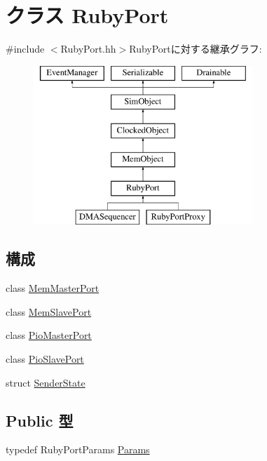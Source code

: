 \hypertarget{classRubyPort}{
\section{クラス RubyPort}
\label{classRubyPort}
}


{\ttfamily \#include $<$RubyPort.hh$>$}RubyPortに対する継承グラフ:\begin{figure}[H]
\begin{center}
\leavevmode
\includegraphics[height=6cm]{classRubyPort}
\end{center}
\end{figure}
\subsection*{構成}
\begin{DoxyCompactItemize}
\item 
class \hyperlink{classRubyPort_1_1MemMasterPort}{MemMasterPort}
\item 
class \hyperlink{classRubyPort_1_1MemSlavePort}{MemSlavePort}
\item 
class \hyperlink{classRubyPort_1_1PioMasterPort}{PioMasterPort}
\item 
class \hyperlink{classRubyPort_1_1PioSlavePort}{PioSlavePort}
\item 
struct \hyperlink{structRubyPort_1_1SenderState}{SenderState}
\end{DoxyCompactItemize}
\subsection*{Public 型}
\begin{DoxyCompactItemize}
\item 
typedef RubyPortParams \hyperlink{classRubyPort_a73ffda3b6b10849321fd359baf61eb3c}{Params}
\end{DoxyCompactItemize}
